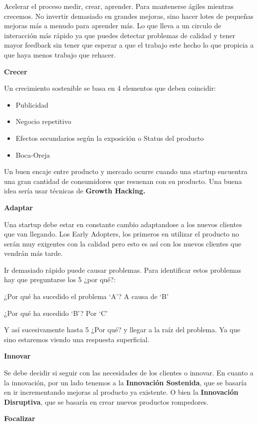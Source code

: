 \documentclass[12pt,twoside,titlepage]{report}
\begin{document}
Acelerar el proceso medir, crear, aprender. Para mantenerse ágiles mientras crecemos. No invertir demasiado en grandes mejoras, sino hacer lotes de pequeñas mejoras más a menudo para aprender más. Lo que lleva a un circulo de interacción más rápido ya que puedes detectar problemas de calidad y tener mayor feedback sin tener que esperar a que el trabajo este hecho lo que propicia a que haya menos trabajo que rehacer.

\textbf{Crecer}

Un crecimiento sostenible se basa en 4 elementos que deben coincidir: 
\begin{itemize}
    \item Publicidad
    \item Negocio repetitivo
    \item Efectos secundarios según la exposición o Status del producto
    \item Boca-Oreja
\end{itemize}


Un buen encaje entre producto y mercado ocurre cuando una startup encuentra una gran cantidad de consumidores que resuenan con su producto. Una buena idea sería usar técnicas de \textbf{Growth Hacking.}

\textbf{Adaptar}

Una startup debe estar en constante cambio adaptandose a los nuevos clientes que van llegando. Los Early Adopters, los primeros en utilizar el producto no serán muy exigentes con la calidad pero esto es así con los nuevos clientes que vendrán más tarde.

Ir demasiado rápido puede causar problemas. Para identificar estos problemas hay que preguntarse los 5 ¿por qué?:

¿Por qué ha sucedido el problema ‘A’? A causa de ‘B’

¿Por qué ha sucedido ‘B’? Por ‘C’

Y así sucesivamente hasta 5 ¿Por qué? y llegar a la raíz del problema. Ya que sino estaremos viendo una respuesta superficial.

\textbf{Innovar}

Se debe decidir si seguir con las necesidades de los clientes o innovar. En cuanto a la innovación, por un lado tenemos a la \textbf{Innovación Sostenida}, que se basaría en ir incrementando mejoras al producto ya existente. O bien la \textbf{Innovación Disruptiva}, que se basaría en crear nuevos productos rompedores.

\textbf{Focalizar}
\end{document}

